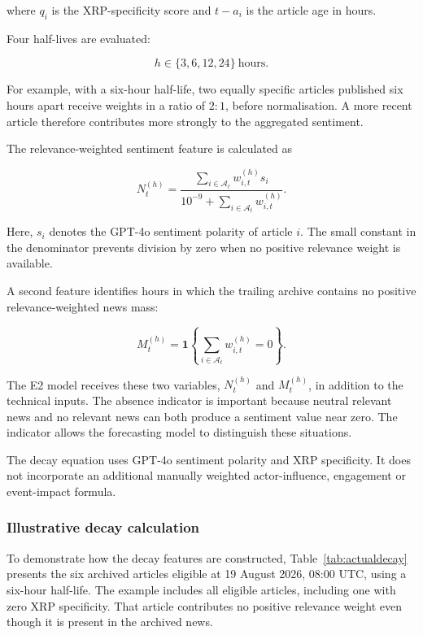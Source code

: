 where $q_i$ is the XRP-specificity score and $t-a_i$ is the article age in hours.

Four half-lives are evaluated:

\begin{equation}
h\in\{3,6,12,24\}\ \mathrm{hours}.
\label{eq:decay_settings}
\end{equation}

For example, with a six-hour half-life, two equally specific articles published six hours apart receive weights in a ratio of $2:1$, before normalisation. A more recent article therefore contributes more strongly to the aggregated sentiment.

The relevance-weighted sentiment feature is calculated as

\begin{equation}
N_t^{(h)}
=
\frac{
\sum_{i\in\mathcal{A}_t}
w_{i,t}^{(h)}s_i
}{
10^{-9}
+
\sum_{i\in\mathcal{A}_t}
w_{i,t}^{(h)}
}.
\label{eq:decay}
\end{equation}

Here, $s_i$ denotes the GPT-4o sentiment polarity of article $i$. The small constant in the denominator prevents division by zero when no positive relevance weight is available.

A second feature identifies hours in which the trailing archive contains no positive relevance-weighted news mass:

\begin{equation}
M_t^{(h)}
=
\mathbf{1}
\left\{
\sum_{i\in\mathcal{A}_t}
w_{i,t}^{(h)}=0
\right\}.
\label{eq:decay_missing}
\end{equation}

The E2 model receives these two variables, $N_t^{(h)}$ and $M_t^{(h)}$, in addition to the technical inputs. The absence indicator is important because neutral relevant news and no relevant news can both produce a sentiment value near zero. The indicator allows the forecasting model to distinguish these situations.

The decay equation uses GPT-4o sentiment polarity and XRP specificity. It does not incorporate an additional manually weighted actor-influence, engagement or event-impact formula.

\subsubsection{Illustrative decay calculation}

To demonstrate how the decay features are constructed, Table~\ref{tab:actualdecay} presents the six archived articles eligible at 19 August 2026, 08:00 UTC, using a six-hour half-life. The example includes all eligible articles, including one with zero XRP specificity. That article contributes no positive relevance weight even though it is present in the archived news.

